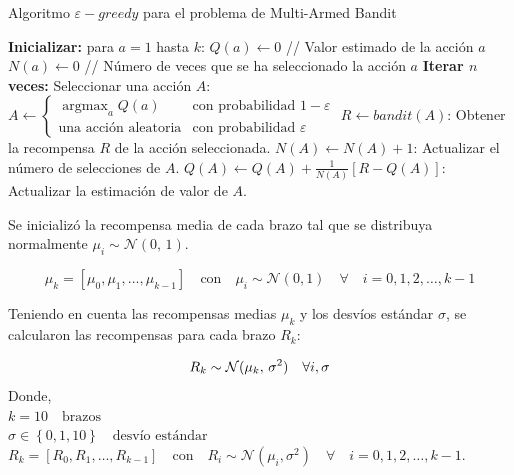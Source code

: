 \documentclass[12pt]{article}
\DeclareMathOperator*{\argmax}{argmax}
\begin{document}
    \begin{algorithm}[H]
        \caption{Algoritmo $\varepsilon-greedy$ para el problema de Multi-Armed Bandit}
        \begin{algorithmic}[1]
            \State \textbf{Inicializar:} para $a = 1$ hasta $k$:
            \State \quad $Q(a) \leftarrow 0$ \quad // Valor estimado de la acción $a$
            \State \quad $N(a) \leftarrow 0$ \quad // Número de veces que se ha seleccionado la acción $a$
            \State \textbf{Iterar $n$ veces:}
            \State \quad Seleccionar una acción $A$:
            \State \quad \quad $A \leftarrow
            \begin{cases}
                \argmax_{a} Q(a) & \text{con probabilidad } 1 - \varepsilon \\
                \text{una acción aleatoria} & \text{con probabilidad } \varepsilon
            \end{cases}$
            \State \quad $R \leftarrow bandit(A)$: Obtener la recompensa $R$ de la acción seleccionada.
            \State \quad $N(A) \leftarrow N(A) + 1$: Actualizar el número de selecciones de $A$.
            \State \quad $Q(A) \leftarrow Q(A) + \frac{1}{N(A)} [R - Q(A)]$: Actualizar la estimación de valor de $A$.
        \end{algorithmic}\label{alg:epsilon_greedy}
    \end{algorithm}

    Se inicializó la recompensa media de cada brazo tal que se distribuya normalmente $\mu_{i} \sim \mathcal{N}(0,\,1)$.

    \[
        \mu_k = \left[ \mu_{0}, \mu_{1}, \ldots, \mu_{k-1} \right] \quad \text{con} \quad \mu_{i} \sim \mathcal{N}(0, 1) \quad \forall \quad i = 0, 1, 2, \ldots, k-1
    \]



    Teniendo en cuenta las recompensas medias $\mu_{k}$ y los desvíos estándar $\sigma$, se calcularon las recompensas para cada brazo $R_{k}$:

    \[
        R_k \sim \mathcal{N}(\mu_k,\,\sigma^{2}) \quad \forall i,\sigma \\
    \]
    Donde,\\
    $k = 10 \quad \text{brazos}$ \\
    $\sigma \in \left\{ 0, 1, 10 \right\} \quad \text{desvío estándar}$ \\
    $R_k = \left[ R_{0}, R_{1}, \ldots, R_{k-1} \right] \quad \text{con} \quad R_{i} \sim \mathcal{N}(\mu_{i}, \sigma^{2}) \quad \forall \quad i = 0, 1, 2, \ldots, k-1.$
\end{document}

